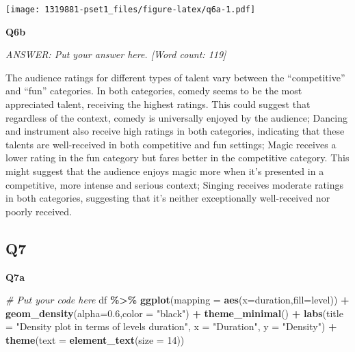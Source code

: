 \documentclass[
]{article}
\newenvironment{Shaded}{\begin{snugshade}}{\end{snugshade}}
\newcommand{\AttributeTok}[1]{\textcolor[rgb]{0.13,0.29,0.53}{#1}}
\newcommand{\CommentTok}[1]{\textcolor[rgb]{0.56,0.35,0.01}{\textit{#1}}}
\newcommand{\DecValTok}[1]{\textcolor[rgb]{0.00,0.00,0.81}{#1}}
\newcommand{\FloatTok}[1]{\textcolor[rgb]{0.00,0.00,0.81}{#1}}
\newcommand{\FunctionTok}[1]{\textcolor[rgb]{0.13,0.29,0.53}{\textbf{#1}}}
\newcommand{\NormalTok}[1]{#1}
\newcommand{\SpecialCharTok}[1]{\textcolor[rgb]{0.81,0.36,0.00}{\textbf{#1}}}
\newcommand{\StringTok}[1]{\textcolor[rgb]{0.31,0.60,0.02}{#1}}
\begin{document}
\texttt{[image: 1319881-pset1\_files/figure-latex/q6a-1.pdf]}

\textbf{Q6b}

\emph{ANSWER: Put your answer here. {[}Word count: 119{]}}

The audience ratings for different types of talent vary between the
``competitive'' and ``fun'' categories. In both categories, comedy seems
to be the most appreciated talent, receiving the highest ratings. This
could suggest that regardless of the context, comedy is universally
enjoyed by the audience; Dancing and instrument also receive high
ratings in both categories, indicating that these talents are
well-received in both competitive and fun settings; Magic receives a
lower rating in the fun category but fares better in the competitive
category. This might suggest that the audience enjoys magic more when
it's presented in a competitive, more intense and serious context;
Singing receives moderate ratings in both categories, suggesting that
it's neither exceptionally well-received nor poorly received.

\hypertarget{q7}{%
\subsection{Q7}\label{q7}}

\textbf{Q7a}

\begin{Shaded}
\begin{Highlighting}[]
\CommentTok{\# Put your code here}
\NormalTok{df }\SpecialCharTok{\%\textgreater{}\%}
  \FunctionTok{ggplot}\NormalTok{(}\AttributeTok{mapping =} \FunctionTok{aes}\NormalTok{(}\AttributeTok{x=}\NormalTok{duration,}\AttributeTok{fill=}\NormalTok{level)) }\SpecialCharTok{+}
  \FunctionTok{geom\_density}\NormalTok{(}\AttributeTok{alpha=}\FloatTok{0.6}\NormalTok{,}\AttributeTok{color =} \StringTok{"black"}\NormalTok{) }\SpecialCharTok{+}
  \FunctionTok{theme\_minimal}\NormalTok{() }\SpecialCharTok{+}
  \FunctionTok{labs}\NormalTok{(}\AttributeTok{title =} \StringTok{"Density plot in terms of level\textquotesingle{}s duration"}\NormalTok{,}
     \AttributeTok{x =} \StringTok{"Duration"}\NormalTok{,}
     \AttributeTok{y =} \StringTok{"Density"}\NormalTok{) }\SpecialCharTok{+}
  \FunctionTok{theme}\NormalTok{(}\AttributeTok{text =} \FunctionTok{element\_text}\NormalTok{(}\AttributeTok{size =} \DecValTok{14}\NormalTok{))}
\end{Highlighting}
\end{Shaded}
\end{document}
